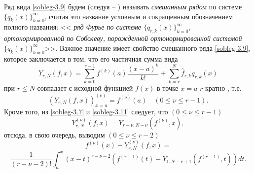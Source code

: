Ряд  вида \eqref{sobleg-3.9} будем (следуя  \cite{Shar11} -- \cite{SHII})   называть \textit{ смешанным рядом} по  системе $\{q_{k}(x)\}_{k=0}^\infty$, считая это название условным и сокращенным обозначением полного названия: <<\textit{ ряд Фурье по системе  $\{q_{r,k}(x)\}_{k=0}^\infty$, ортонормированной по Соболеву, порожденной ортонормированной системой $\{q_{k}(x)\}_{k=0}^\infty$}>>.
Важное значение имеет свойство  смешанного ряда \eqref{sobleg-3.9}, которое заключается в том, что его частичная сумма вида
\begin{equation}\label{sobleg-3.11}
Y_{r,N}(f,x)=\sum_{k=0}^{r-1} f^{(k)}(a)\frac{(x-a)^k}{k!}+ \sum_{k=r}^{N} \hat f_{r,k}q_{r,k}(x)
\end{equation}
 при   $r\le N$  совпадает с исходной функцией $f(x)$   в точке $x=a$ $r$-кратно , т.е.
\begin{equation}\label{sobleg-3.12}
(Y_{r,N}(f,x))^{(\nu)}_{x=a}=f^{(\nu)}(a)\quad (0\le\nu\le r-1).
\end{equation}
Кроме того, из \eqref{sobleg-3.7} и \eqref{sobleg-3.11} следует, что $(0\le\nu\le r-1)$
\begin{equation}\label{sobleg-3.13}
 Y_{r,N}^{(\nu)}(f,x)=Y_{r-\nu,N-\nu}(f^{(\nu)},x),
 \end{equation}
отсюда, в свою очередь, выводим $(0\le\nu\le r-2)$
 $$
f^{(\nu)}(x)-Y_{r,N}^{(\nu)}(f,x)=
$$
  \begin{equation}\label{sobleg-3.14}
\frac{1}{(r-\nu-2)!}\int_a^x (x-t)^{r-\nu-2}(f^{(r-1)}(t)-Y_{1,N-r+1}(f^{(r-1)},t))dt.
 \end{equation}

